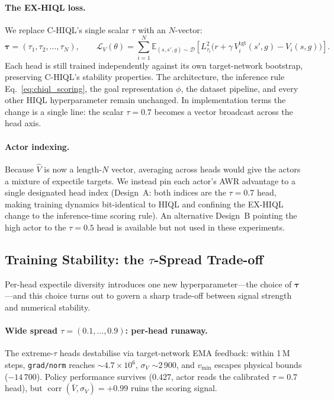 \documentclass[11pt]{article}
\begin{document}
\paragraph{The EX-HIQL loss.}
We replace C-HIQL's single scalar $\tau$ with an $N$-vector:
\begin{equation}
  \boldsymbol{\tau} = (\tau_1, \tau_2, \ldots, \tau_N),
  \qquad
  \mathcal{L}_V(\theta) = \sum_{i=1}^{N}
    \mathbb{E}_{(s,s',g) \sim \mathcal{D}}\!\left[
      L_{\tau_i}^2\!\big(r + \gamma\,V_i^{\text{tgt}}(s',g) - V_i(s,g)\big)
    \right].
\end{equation}
Each head is still trained independently against its own target-network
bootstrap, preserving C-HIQL's stability properties.
The architecture, the inference rule Eq.~\eqref{eq:chiql_scoring}, the goal
representation $\phi$, the dataset pipeline, and every other HIQL
hyperparameter remain unchanged.
In implementation terms the change is a single line: the scalar
$\tau = 0.7$ becomes a vector broadcast across the head axis.

\paragraph{Actor indexing.}
Because $\hat V$ is now a length-$N$ vector, averaging across heads would give
the actors a mixture of expectile targets.
We instead pin each actor's AWR advantage to a single designated head index
(Design~A: both indices are the $\tau = 0.7$ head, making training dynamics
bit-identical to HIQL and confining the EX-HIQL change to the inference-time
scoring rule). An alternative Design~B pointing the high actor to the
$\tau=0.5$ head is available but not used in these experiments.

\subsection{Training Stability: the $\tau$-Spread Trade-off}
\label{subsec:exhiql_stability}

Per-head expectile diversity introduces one new hyperparameter---the choice of
$\boldsymbol{\tau}$---and this choice turns out to govern a sharp
trade-off between signal strength and numerical stability.

\paragraph{Wide spread $\tau = (0.1,\ldots,0.9)$: per-head runaway.}
The extreme-$\tau$ heads destabilise via target-network EMA feedback:
within 1\,M steps, \texttt{grad/norm} reaches $\sim 4.7{\times}10^6$,
$\sigma_V$ $\sim$2\,900, and $v_\text{min}$ escapes physical bounds
($-14\,700$).
Policy performance survives ($0.427$, actor reads the calibrated
$\tau{=}0.7$ head), but $\operatorname{corr}(\bar V, \sigma_V) =
\mathbf{+0.99}$ ruins the scoring signal.
\end{document}
